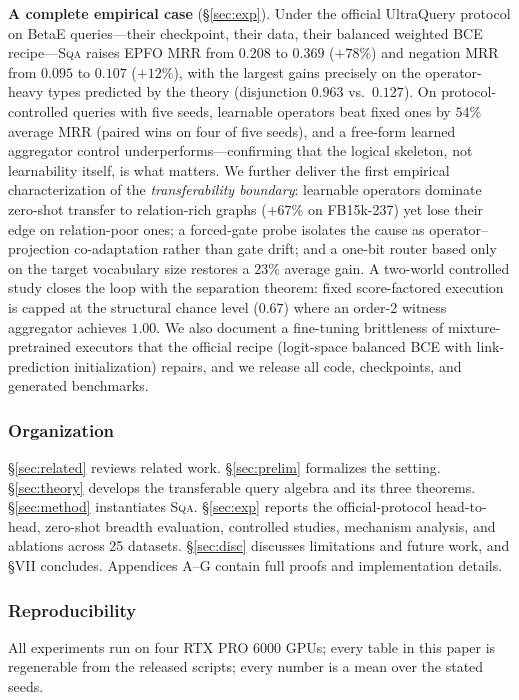 \documentclass[journal]{IEEEtran}
\newcommand{\SQA}{\textsc{Sqa}}
\begin{document}
\textbf{A complete empirical case} (\S\ref{sec:exp}). Under the official
UltraQuery protocol on BetaE queries---their checkpoint, their data, their
balanced weighted BCE recipe---\SQA{} raises EPFO MRR from $0.208$ to
$0.369$ ($+78\%$) and negation MRR from $0.095$ to $0.107$ ($+12\%$),
with the largest gains precisely on the operator-heavy types predicted by
the theory (disjunction $0.963$ vs.\ $0.127$). On protocol-controlled
queries with five seeds, learnable operators beat fixed ones by $54\%$
average MRR (paired wins on four of five seeds), and a free-form
learned aggregator control underperforms---confirming that the logical
skeleton, not learnability itself, is what matters. We further deliver the
first empirical characterization of the \emph{transferability
boundary}: learnable
operators dominate zero-shot transfer to relation-rich graphs ($+67\%$ on
FB15k-237) yet lose their edge on relation-poor ones; a forced-gate probe
isolates the cause as operator--projection co-adaptation rather than gate
drift; and a one-bit router based only on the target vocabulary size
restores a $23\%$ average gain. A two-world controlled study closes the
loop with the separation theorem: fixed score-factored execution is capped
at the structural chance level ($0.67$) where an order-2 witness aggregator
achieves $1.00$. We also document a fine-tuning brittleness of
mixture-pretrained executors that the official recipe (logit-space balanced
BCE with link-prediction initialization) repairs, and we release all code,
checkpoints, and generated benchmarks.

\subsubsection*{Organization} \S\ref{sec:related} reviews related work.
\S\ref{sec:prelim} formalizes the setting. \S\ref{sec:theory} develops
the transferable query algebra and its three theorems. \S\ref{sec:method}
instantiates \SQA{}. \S\ref{sec:exp} reports the official-protocol head-to-head,
zero-shot breadth evaluation, controlled studies, mechanism analysis,
and ablations across 25 datasets. \S\ref{sec:disc} discusses limitations and
future work, and \S{}VII concludes. Appendices A--G contain full proofs
and implementation details.

\subsubsection*{Reproducibility} All experiments run on four RTX PRO 6000
GPUs; every table in this paper is regenerable from the released scripts;
every number is a mean over the stated seeds.
\end{document}
